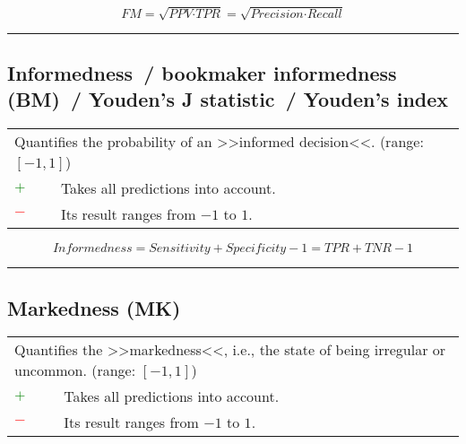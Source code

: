 \documentclass{article}
\begin{document}
\begin{equation}
	\textit{FM} = \sqrt{\textit{PPV} \cdot \textit{TPR}} = \sqrt{\textit{Precision} \cdot \textit{Recall}}
%
	\label{equation:FM}
\end{equation}

\hrule


\subsection[Informedness~/ bookmaker informedness (BM)~/ Youden's J statistic~/ Youden's index]{Informedness~/ bookmaker informedness (BM)~/ Youden's J statistic~/ Youden's index \cite{peirce1884numerical, youden1950index}}

\begin{table}[H]\centering
	\begin{tabular}{m{}m{}}
		\multicolumn{2}{m{0.95\textwidth}}{Quantifies the probability of an >>informed decision<<. (range: $[-1, 1]$)} \\
		\textcolor{Green}{$+$} & Takes all predictions into account. \\
		\textcolor{Red}{$-$}   & Its result ranges from $-1$ to $1$.
	\end{tabular}
\end{table}

\begin{equation}
	\textit{Informedness} = \textit{Sensitivity} + \textit{Specificity} - 1 = \textit{TPR} + \textit{TNR} - 1
%
	\label{equation:informedness}
\end{equation}

\hrule


\subsection[Markedness (MK)]{Markedness (MK) \cite{powers2020evaluation}}

\begin{table}[H]\centering
	\begin{tabular}{m{}m{}}
		\multicolumn{2}{m{0.95\textwidth}}{Quantifies the >>markedness<<, i.e., the state of being irregular or uncommon. (range: $[-1, 1]$)} \\
		\textcolor{Green}{$+$} & Takes all predictions into account. \\
		\textcolor{Red}{$-$}   & Its result ranges from $-1$ to $1$.
	\end{tabular}
\end{table}
\end{document}
